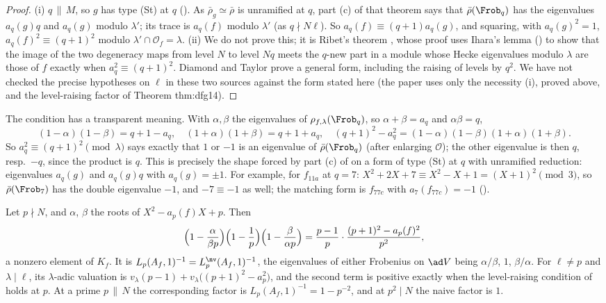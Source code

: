 \begin{proof}
(i) $q\,\|\,M$, so $g$ has type (St) at $q$ (). As $\bar\rho_g\simeq\bar\rho$ is unramified at $q$, part (c) of that theorem says that
$\bar\rho(\Frob_q)$ has the eigenvalues $a_q(g)q$ and $a_q(g)$ modulo $\lambda'$; its trace is $a_q(f)$ modulo $\lambda'$ (as $q\nmid N\ell$). So $a_q(f)\equiv(q+1)a_q(g)$, and squaring, with
$a_q(g)^2=1$, $a_q(f)^2\equiv(q+1)^2$ modulo $\lambda'\cap\mathcal{O}_f=\lambda$. (ii) We do not prove this; it is Ribet's theorem \cite{Ribet84}, whose proof uses Ihara's lemma
() to show that the image of the two degeneracy maps from level $N$ to level $Nq$ meets the $q$-new part in a module whose
Hecke eigenvalues modulo $\lambda$ are those of $f$ exactly when $a_q^2\equiv(q+1)^2$. Diamond and Taylor \cite{DiamondTaylor94} prove a general form, including the
raising of levels by $q^2$. We have not checked the precise hypotheses on $\ell$ in these two sources against the form stated here (the paper uses
only the necessity (i), proved above, and the level-raising factor of Theorem thm:dfg14).
\end{proof}

The condition has a transparent meaning. With $\alpha,\beta$ the eigenvalues of $\rho_{f,\lambda}(\Frob_q)$, so $\alpha+\beta=a_q$ and $\alpha\beta=q$,
\[
(1-\alpha)(1-\beta)=q+1-a_q,\quad(1+\alpha)(1+\beta)=q+1+a_q,\quad (q+1)^2-a_q^2=(1-\alpha)(1-\beta)(1+\alpha)(1+\beta).
\]
So $a_q^2\equiv(q+1)^2\pmod\lambda$ says exactly that $1$ or $-1$ is an eigenvalue of $\bar\rho(\Frob_q)$ (after enlarging $\mathcal{O}$); the other eigenvalue is then $q$, resp.\ $-q$, since the
product is $q$. This is precisely the shape forced by part (c) of  on a form of type (St) at $q$ with unramified reduction: eigenvalues
$a_q(g)$ and $a_q(g)q$ with $a_q(g)=\pm1$. For example, for $f_{11a}$ at $q=7$: $X^2+2X+7\equiv X^2-X+1=(X+1)^2\pmod3$, so $\bar\rho(\Frob_7)$ has the double eigenvalue $-1$, and $-7\equiv-1$
as well; the matching form is $f_{77c}$ with $a_7(f_{77c})=-1$ ().

\begin{proposition}\label{prop:modgalrep:level-raising-factor}
Let $p\nmid N$, and $\alpha$, $\beta$ the roots of $X^2-a_p(f)X+p$. Then
\[
\Bigl(1-\frac{\alpha}{\beta p}\Bigr)\Bigl(1-\frac1p\Bigr)\Bigl(1-\frac{\beta}{\alpha p}\Bigr)=\frac{p-1}{p}\cdot\frac{(p+1)^2-a_p(f)^2}{p^2},
\]
a nonzero element of $K_f$. It is $L_p(A_f,1)^{-1}=L_p^{\nv}(A_f,1)^{-1}$, the eigenvalues of either Frobenius on $\ad V$ being $\alpha/\beta$, $1$, $\beta/\alpha$. For $\ell\ne p$ and
$\lambda\mid\ell$, its $\lambda$-adic valuation is $v_\lambda(p-1)+v_\lambda\bigl((p+1)^2-a_p^2\bigr)$, and the second term is positive exactly when the level-raising condition of
 holds at $p$. At a prime $p\,\|\,N$ the corresponding factor is $L_p(A_f,1)^{-1}=1-p^{-2}$, and at $p^2\mid N$ the naive factor is $1$.
\end{proposition}

